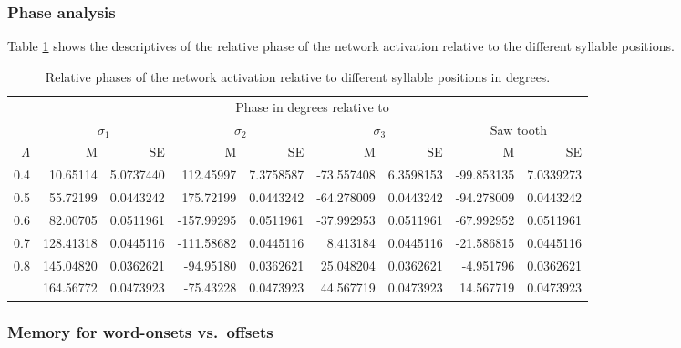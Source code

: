 \documentclass[
]{article}
\begin{document}
\hypertarget{phase-analysis-1}{%
\subsubsection{Phase analysis}\label{phase-analysis-1}}

Table \ref{tab:basic-experiment-global-phase-table2} shows the
descriptives of the relative phase of the network activation relative to
the different syllable positions.

\begin{table}

\caption{\label{tab:basic-experiment-global-phase-table2}Relative phases of the network activation relative to different syllable positions in degrees.}
\centering
\begin{tabular}[t]{rrrrrrrrr}
\toprule
\multicolumn{1}{c}{ } & \multicolumn{8}{c}{Phase in degrees relative to} \\
\cmidrule(l{3pt}r{3pt}){2-9}
\multicolumn{1}{c}{ } & \multicolumn{2}{c}{$\sigma_1$} & \multicolumn{2}{c}{$\sigma_2$} & \multicolumn{2}{c}{$\sigma_3$} & \multicolumn{2}{c}{Saw tooth} \\
\cmidrule(l{3pt}r{3pt}){2-3} \cmidrule(l{3pt}r{3pt}){4-5} \cmidrule(l{3pt}r{3pt}){6-7} \cmidrule(l{3pt}r{3pt}){8-9}
$\Lambda$ & M & SE & M & SE & M & SE & M & SE\\
\midrule
0.4 & 10.65114 & 5.0737440 & 112.45997 & 7.3758587 & -73.557408 & 6.3598153 & -99.853135 & 7.0339273\\
0.5 & 55.72199 & 0.0443242 & 175.72199 & 0.0443242 & -64.278009 & 0.0443242 & -94.278009 & 0.0443242\\
0.6 & 82.00705 & 0.0511961 & -157.99295 & 0.0511961 & -37.992953 & 0.0511961 & -67.992952 & 0.0511961\\
0.7 & 128.41318 & 0.0445116 & -111.58682 & 0.0445116 & 8.413184 & 0.0445116 & -21.586815 & 0.0445116\\
0.8 & 145.04820 & 0.0362621 & -94.95180 & 0.0362621 & 25.048204 & 0.0362621 & -4.951796 & 0.0362621\\
\addlinespace
0.9 & 164.56772 & 0.0473923 & -75.43228 & 0.0473923 & 44.567719 & 0.0473923 & 14.567719 & 0.0473923\\
\bottomrule
\end{tabular}
\end{table}

\clearpage

\hypertarget{memory-for-word-onsets-vs.-offsets}{%
\subsubsection{Memory for word-onsets
vs.~offsets}\label{memory-for-word-onsets-vs.-offsets}}
\end{document}

